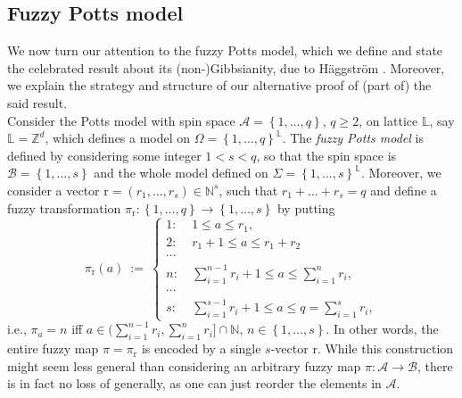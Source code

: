 \documentclass[12pt]{article}
\newcommand{\A}{\mathcal{A}}
\newcommand{\B}{\mathcal{B}}
\renewcommand{\L}{\mathbb{L}}
\newcommand{\N}{\mathbb{N}}
\renewcommand{\r}{\mathrm{r}}
\newcommand{\Z}{\mathbb{Z}}
\newcommand{\set}[1]{\left\{#1\right\}}
\newcommand{\ra}{\rightarrow}
\newcommand{\1}{\mathbbm{1}}
\newcommand{\5}{\vspace{0.5cm}}
\theoremstyle{definition}
\begin{document}

\subsection{Fuzzy Potts model}

We now turn our attention to the fuzzy Potts model, which we define and state the celebrated result about its (non-)Gibbsianity, due to H\"aggstr\"om \cite{Hag}. Moreover, we explain the strategy and structure of our alternative proof of (part of) the said result. \\

Consider the Potts model with spin space $\A=\set{1,\ldots,q}$, $q\geq 2$, on lattice $\L$, say $\L=\Z^d$, which defines a model on $\Omega=\set{1,\ldots,q}^\L$. The \textit{fuzzy Potts model} is defined by considering some integer $1<s<q$, so that the spin space is $\B=\set{1,\ldots,s}$ and the whole model defined on $\Sigma=\set{1,\ldots,s}^\L$. Moreover, we consider a vector $\r=(r_1,\ldots,r_s)\in\N^s$, such that $r_1+\ldots+r_s=q$ and define a fuzzy transformation $\pi_\r:\set{1,\ldots,q}\ra\set{1,\ldots,s}$ by putting 
$$\pi_\r(a) ~:=~ \begin{cases}
1: ~&1\leq a\leq r_1,\\
2: ~&r_1+1\leq a\leq r_1+r_2 \\
\cdots \\
n: ~&\sum_{i=1}^{n-1} r_i + 1\leq a\leq \sum_{i=1}^n r_i,\\
\cdots \\
s: ~&\sum_{i=1}^{s-1}r_i + 1\leq a\leq q=\sum_{i=1}^s r_i,
\end{cases}$$
i.e., $\pi_a=n$ iff $a\in(\sum_{i=1}^{n-1}r_i,\sum_{i=1}^n r_i]\cap \N$, $n\in\set{1,\ldots,s}$. In other words, the entire fuzzy map $\pi=\pi_\r$ is encoded by a single $s$-vector $\r$. While this construction might seem less general than considering an arbitrary fuzzy map $\pi:\A\ra\B$, there is in fact no loss of generally, as one can just reorder the elements in $\A$. \\
\end{document}
